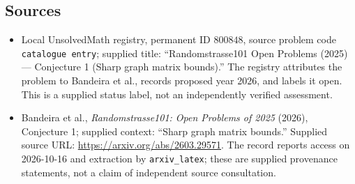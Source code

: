 \documentclass[11pt]{article}
\begin{document}
\subsection{Sources}
\begin{itemize}
\item Local UnsolvedMath registry, permanent ID \(800848\), source problem code \texttt{catalogue entry}; supplied title: ``Randomstrasse101 Open Problems (2025) --- Conjecture 1 (Sharp graph matrix bounds).'' The registry attributes the problem to Bandeira et al., records proposed year 2026, and labels it open. This is a supplied status label, not an independently verified assessment.
\item Bandeira et al., \emph{Randomstrasse101: Open Problems of 2025} (2026), Conjecture 1; supplied context: ``Sharp graph matrix bounds.'' Supplied source URL: \url{https://arxiv.org/abs/2603.29571}. The record reports access on 2026-10-16 and extraction by \texttt{arxiv\_latex}; these are supplied provenance statements, not a claim of independent source consultation.
\end{itemize}
\end{document}
